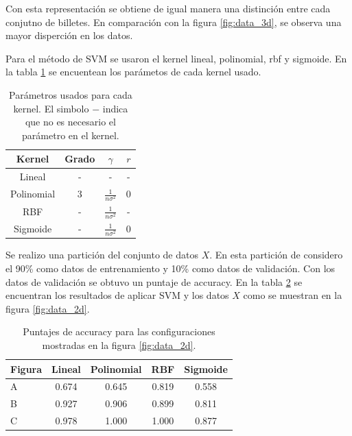 Con esta representación se obtiene de igual manera una distinción entre cada conjutno de billetes. En comparación con la figura \ref{fig:data_3d}, se observa una mayor disperción en los datos.

Para el método de SVM se usaron el kernel lineal, polinomial, rbf y sigmoide. En la tabla \ref{table:parameters} se encuentean los parámetos de cada kernel usado.


\begin{table}[H]
    \centering
    \begin{tabular}{cccc} \hline
        Kernel     & Grado & $\gamma$              & $r$ \\ \hline
        Lineal     & -     & -                     & -   \\
        Polinomial & 3     & $\frac{1}{n\sigma^2}$ & 0   \\
        RBF        & -     & $\frac{1}{n\sigma^2}$ & -   \\
        Sigmoide   & -     & $\frac{1}{n\sigma^2}$ & 0   \\ \hline
    \end{tabular}
    \caption{Parámetros usados para cada kernel. El simbolo $-$ indica que no es necesario el parámetro en el kernel.}
    \label{table:parameters}
\end{table}


Se realizo una partición del conjunto de datos $X$. En esta partición de considero el 90\% como datos de entrenamiento y 10\% como datos de validación. Con los datos de validación se obtuvo un puntaje de accuracy. En la tabla \ref{table:data_2d} se encuentran los resultados de aplicar SVM y los datos $X$ como se muestran en la figura \ref{fig:data_2d}.

\begin{table}[H]
    \centering
    \begin{tabular}{lcccc} \hline
        Figura & Lineal & Polinomial & RBF   & Sigmoide \\ \hline
        A      & 0.674  & 0.645      & 0.819 & 0.558    \\
        B      & 0.927  & 0.906      & 0.899 & 0.811    \\
        C      & 0.978  & 1.000      & 1.000 & 0.877    \\ \hline
    \end{tabular}
    \caption{Puntajes de accuracy para las configuraciones mostradas en la figura \ref{fig:data_2d}.}
    \label{table:data_2d}
\end{table}

